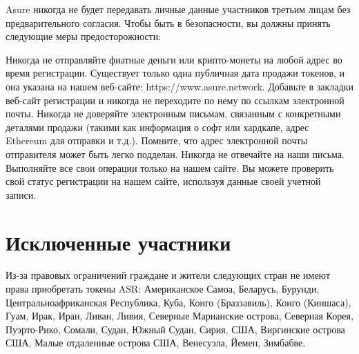 Asure никогда не будет передавать личные данные участников третьим лицам без предварительного согласия. Чтобы быть в безопасности, вы должны принять следующие меры предосторожности:

Никогда не отправляйте фиатные деньги или крипто-монеты на любой адрес во время регистрации. Существует только одна публичная дата продажи токенов, и она указана на нашем веб-сайте: https://www.asure.network. Добавьте в закладки веб-сайт регистрации и никогда не переходите по нему по ссылкам электронной почты.
Никогда не доверяйте электронным письмам, связанным с конкретными деталями продажи (такими как информация о софт или хардкапе, адрес Ethereum для отправки и т.д.). Помните, что адрес электронной почты отправителя может быть легко подделан.
Никогда не отвечайте на наши письма. Выполняйте все свои операции только на нашем сайте. Вы можете проверить свой статус регистрации на нашем сайте, используя данные своей учетной записи.


\section{Исключенные участники}
Из-за правовых ограничений граждане и жители следующих стран не имеют права приобретать токены ASR: Американское Самоа, Беларусь, Бурунди, Центральноафриканская Республика, Куба, Конго (Браззавиль), Конго (Киншаса), Гуам, Ирак, Иран, Ливан, Ливия, Северные Марианские острова, Северная Корея, Пуэрто-Рико, Сомали, Судан, Южный Судан, Сирия, США, Виргинские острова США, Малые отдаленные острова США, Венесуэла, Йемен, Зимбабве.
